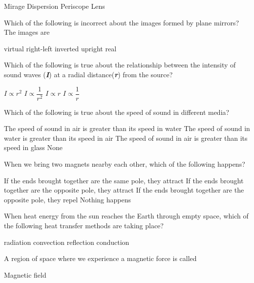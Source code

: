 \documentclass[12pt,addpoints]{exam}
\begin{document}
{{{\begin{questions}
\begin{oneparchoices}
						\choice Mirage
						\choice Dispersion
						\choice Periscope
						\choice Lens
					\end{oneparchoices}
					\question Which of the following is incorrect about the images formed by plane mirrors? The images are \\
					\begin{oneparchoices}
						\choice virtual
						\choice right-left inverted
						\choice upright
						\choice real
					\end{oneparchoices}
					\question Which of the following is true about the relationship between the intensity of sound waves (\textit{\textbf{I}}) at a radial distance(\textbf{\textit{r}}) from the source? \\
					\begin{oneparchoices}
						\choice $I\propto r^2$
						\choice $I\propto \dfrac{1}{r^2}$
						\choice $I\propto r$
						\choice $I\propto \dfrac{1}{r}$
					\end{oneparchoices}
					\question Which of the following is true about the speed of sound in different media? 
					\begin{choices}
						\choice The speed of sound in air is greater than its speed in water
						\choice The speed of sound in water is greater than its speed in air
						\choice The speed of sound in air is greater than its speed in glass
						\choice None
					\end{choices}
					\question When we bring two magnets nearby each other, which of the following happens?
					\begin{choices}
						\choice If the ends brought together are the same pole, they attract
						\choice If the ends brought together are the opposite pole, they attract
						\choice If the ends brought together are the opposite pole, they repel
						\choice Nothing happens
					\end{choices} 
					\question When heat energy from the sun reaches the Earth through empty space, which of the following heat transfer methods are taking place? \\
					\begin{oneparchoices}
						\choice radiation
						\choice convection
						\choice reflection
						\choice conduction
					\end{oneparchoices}
					\question A region of space where we experience a magnetic force is called \\
					\begin{oneparchoices}
						\choice Magnetic field

\end{oneparchoices}
\end{questions}}}}
\end{document}
